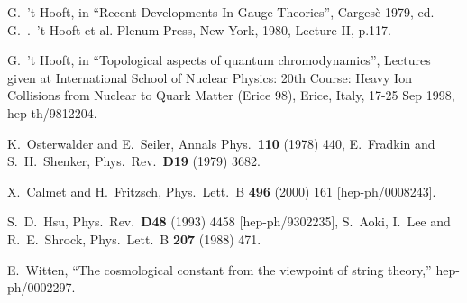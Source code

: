 \documentclass[a4paper,12pt]{article}
\begin{document}
\begin{thebibliography}{10}
 G.~'t Hooft, in ``Recent Developments In
  Gauge Theories'', Carges\`e 1979, ed.  G.~.~'t Hooft et al. Plenum
  Press, New York, 1980, Lecture II, p.117. 

 G.~'t Hooft, in ``Topological aspects of
  quantum chromodynamics'', Lectures given at International School of
  Nuclear Physics: 20th Course: Heavy Ion Collisions from Nuclear to
  Quark Matter (Erice 98), Erice, Italy, 17-25 Sep 1998,
hep-th/9812204.

K.~Osterwalder and E.~Seiler,
Annals Phys.\  {\bf 110} (1978) 440,
%
E.~Fradkin and S.~H.~Shenker,
Phys.\ Rev.\  {\bf D19} (1979) 3682.

X.~Calmet and H.~Fritzsch,
Phys.\ Lett.\ B {\bf 496} (2000) 161
[hep-ph/0008243].

S.~D.~Hsu,
Phys.\ Rev.\  {\bf D48} (1993) 4458
[hep-ph/9302235],
S.~Aoki, I.~Lee and R.~E.~Shrock,
Phys.\ Lett.\ B {\bf 207} (1988) 471.

E.~Witten,
``The cosmological constant from the viewpoint of string theory,''
hep-ph/0002297.
\end{thebibliography}
\end{document}
